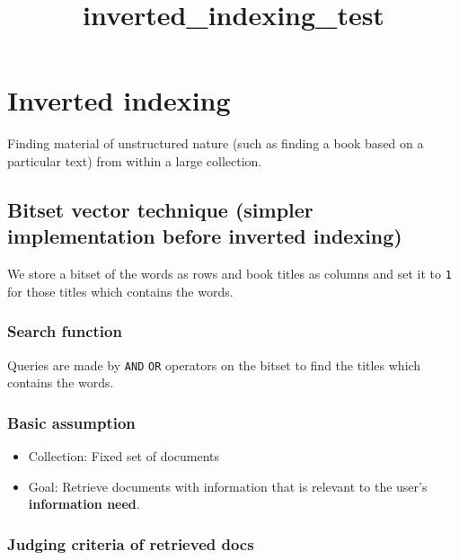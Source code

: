 \documentclass[11pt]{article}
\title{inverted\_indexing\_test}
\providecommand{\tightlist}{%
      \setlength{\itemsep}{0pt}\setlength{\parskip}{0pt}}
\begin{document}
    
    
    \maketitle
    
    

    
    \hypertarget{inverted-indexing}{%
\section{Inverted indexing}\label{inverted-indexing}}

Finding material of unstructured nature (such as finding a book based on
a particular text) from within a large collection.

\hypertarget{bitset-vector-technique-simpler-implementation-before-inverted-indexing}{%
\subsection{Bitset vector technique (simpler implementation before
inverted
indexing)}\label{bitset-vector-technique-simpler-implementation-before-inverted-indexing}}

We store a bitset of the words as rows and book titles as columns and
set it to \texttt{1} for those titles which contains the words.

\hypertarget{search-function}{%
\subsubsection{Search function}\label{search-function}}

Queries are made by \texttt{AND} \texttt{OR} operators on the bitset to
find the titles which contains the words.

\hypertarget{basic-assumption}{%
\subsubsection{Basic assumption}\label{basic-assumption}}

\begin{itemize}
\tightlist
\item
  Collection: Fixed set of documents
\item
  Goal: Retrieve documents with information that is relevant to the
  user's \textbf{information need}.
\end{itemize}

\hypertarget{judging-criteria-of-retrieved-docs}{%
\subsubsection{Judging criteria of retrieved
docs}\label{judging-criteria-of-retrieved-docs}}
\end{document}
